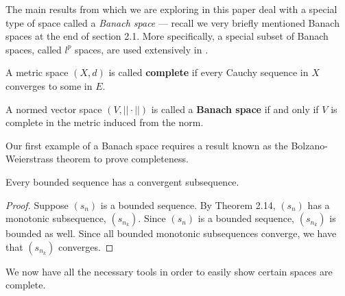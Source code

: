 The main results from \cite{main} which we are exploring in this paper deal with a special type of space called a \textit{Banach space} --- recall we very briefly mentioned Banach spaces at the end of section 2.1.  More specifically, a special subset of Banach spaces, called $l^p$ spaces, are used extensively in \cite{main}.

\begin{defn}
A metric space $(X,d)$ is called \textbf{complete} if every Cauchy sequence in $X$ converges to some in $E$.
\end{defn}

\begin{defn}
A normed vector space $(V, ||\cdot||)$ is called a \textbf{Banach space} if and only if $V$ is complete in the metric induced from the norm.
\end{defn}

Our first example of a Banach space requires a result known as the Bolzano-Weierstrass theorem to prove completeness.

\begin{theorem}
Every bounded sequence has a convergent subsequence.
\end{theorem}

\begin{proof}
Suppose $(s_n)$ is a bounded sequence.  By Theorem 2.14, $(s_n)$ has a monotonic subsequence, $(s_{n_k})$.  Since $(s_n)$ is a bounded sequence, $(s_{n_k})$ is bounded as well.  Since all bounded monotonic subsequences converge, we have that $(s_{n_k})$ converges.
\end{proof}

We now have all the necessary tools in order to easily show certain spaces are complete.

